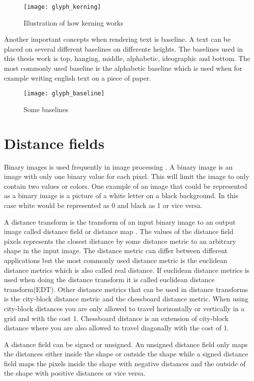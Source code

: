 \begin{figure}[H]
\texttt{[image: glyph\_kerning]}
\caption{Illustration of how kerning works}
\end{figure}

Another important concepts when rendering text is baseline. A text can be placed on several different baselines on differente heights. The baselines used in this thesis work is top, hanging, middle, alphabetic, ideographic and bottom. The most commonly used baseline is the alphabetic baseline which is used when for example writing english text on a piece of paper.

\begin{figure}[H]
\texttt{[image: glyph\_baseline]}
\caption{Some baselines}
\end{figure}

\section{Distance fields}\label{distancefield}
Binary images is used frequently in image processing \citep{Ragnemalm:1993}. A binary image is an image with only one binary value for each pixel. This will limit the image to only contain two values or colors. One example of an image that could be represented as a binary image is a picture of a white letter on a black background. In this case white would be represented as 0 and black as 1 or vice versa.

A distance transform is the transform of an input binary image to an output image called distance field or distance map \citep{rosenfeld1966}. The values of the distance field pixels represents the closest distance by some distance metric to an arbitrary shape in the input image. The distance metric can differ between different applications but the most commonly used distance metric is the euclidean distance metrics which is also called real distance. If euclidean distance metrics is used when doing the distance transform it is called euclidean distance transform(EDT). Other distance metrics that can be used in distance transforms is the city-block distance metric and the chessboard distance metric. When using city-block distances you are only allowed to travel horizontally or vertically in a grid and with the cost 1. Chessboard distance is an extension of city-block distance where you are also allowed to travel diagonally with the cost of 1. 

A distance field can be signed or unsigned. An unsigned distance field only maps the distances either inside the shape or outside the shape while a signed distance field maps the pixels inside the shape with negative distances and the outside of the shape with positive distances or vice versa.

